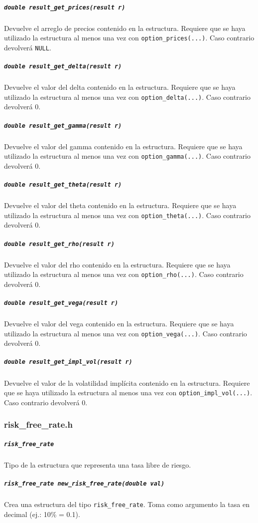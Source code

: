 \documentclass[12pt,a4paper,final]{article}
\begin{document}
			\subparagraph{\texttt{double result\_get\_prices(result r)}}
				Devuelve el arreglo de precios contenido en la estructura.
				Requiere que se haya utilizado la estructura al menos una vez
				con \texttt{option\_prices(...)}. Caso contrario devolverá
				\texttt{NULL}.

			\subparagraph{\texttt{double result\_get\_delta(result r)}}
				Devuelve el valor del delta contenido en la estructura.
				Requiere que se haya utilizado la estructura al menos una vez
				con \texttt{option\_delta(...)}. Caso contrario devolverá 0.

			\subparagraph{\texttt{double result\_get\_gamma(result r)}}
				Devuelve el valor del gamma contenido en la estructura.
				Requiere que se haya utilizado la estructura al menos una vez
				con \texttt{option\_gamma(...)}. Caso contrario devolverá 0.

			\subparagraph{\texttt{double result\_get\_theta(result r)}}
				Devuelve el valor del theta contenido en la estructura.
				Requiere que se haya utilizado la estructura al menos una vez
				con \texttt{option\_theta(...)}. Caso contrario devolverá 0.

			\subparagraph{\texttt{double result\_get\_rho(result r)}}
				Devuelve el valor del rho contenido en la estructura.
				Requiere que se haya utilizado la estructura al menos una vez
				con \texttt{option\_rho(...)}. Caso contrario devolverá 0.

			\subparagraph{\texttt{double result\_get\_vega(result r)}}
				Devuelve el valor del vega contenido en la estructura.
				Requiere que se haya utilizado la estructura al menos una vez
				con \texttt{option\_vega(...)}. Caso contrario devolverá 0.

			\subparagraph{\texttt{double result\_get\_impl\_vol(result r)}}
				Devuelve el valor de la volatilidad implícita contenido en la estructura.
				Requiere que se haya utilizado la estructura al menos una vez
				con \texttt{option\_impl\_vol(...)}. Caso contrario devolverá 0.

		\subsubsection{risk\_free\_rate.h}

			\subparagraph{\texttt{risk\_free\_rate}}
				Tipo de la estructura que representa una tasa libre de riesgo.

			\subparagraph{\texttt{risk\_free\_rate new\_risk\_free\_rate(double val)}}
				Crea una estructura del tipo \texttt{risk\_free\_rate}. Toma como argumento
				la tasa en decimal (ej.: 10\% = 0.1).
\end{document}
